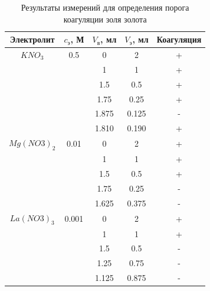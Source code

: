 \documentclass[a4paper,12pt]{article}
\begin{document}
\begin{enumerate}
\begin{table}[h!]
\centering
\begin{tabular}{|c|c|c|c|c|}
\hline
Электролит             & $c_{\text{э}}$, М          & $V_{\text{в}}$, мл & $V_{\text{э}} $, мл & Коагуляция \\ \hline
$KNO_3 $               & 0.5                   & 0             & 2              & +          \\ \cline{3-5} 
\multicolumn{1}{|l|}{} &                       & 1             & 1              & +          \\ \cline{3-5} 
                       &                       & 1.5           & 0.5            & +          \\ \cline{3-5} 
                       &                       & 1.75          & 0.25           & +          \\ \cline{3-5} 
                       &                       & 1.875         & 0.125          & -          \\ \cline{3-5} 
                       &                       & 1.810         & 0.190          & +          \\ \hline
$Mg(NO3)_2$            & 0.01                  & 0             & 2              & +          \\ \hline
\multicolumn{1}{|l|}{} &                       & 1             & 1              & +          \\ \cline{3-5} 
                       &                       & 1.5           & 0.5            & +          \\ \cline{3-5} 
                       &                       & 1.75          & 0.25           & -          \\ \cline{3-5} 
\multicolumn{1}{|l|}{} & \multicolumn{1}{l|}{} & 1.625         & 0.375          & -          \\ \hline
$La(NO3)_3$            & 0.001                 & 0             & 2              & +          \\ \hline
\multicolumn{1}{|l|}{} &                       & 1             & 1              & +          \\ \cline{3-5} 
                       &                       & 1.5           & 0.5            & -          \\ \cline{3-5} 
                       &                       & 1.25          & 0.75           & -          \\ \cline{3-5} 
                       &                       & 1.125         & 0.875          & -          \\ \hline
\end{tabular}
\caption{Результаты измерений для определения порога коагуляции золя золота}
\label{tab:my-table}
\end{table}
    

\end{enumerate}
\end{document}
